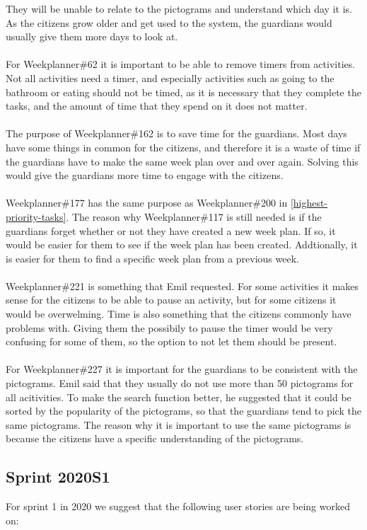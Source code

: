 They will be unable to relate to the pictograms and understand which day it is.
As the citizens grow older and get used to the system, the guardians would usually give them more days to look at.
\\\\
For Weekplanner\#62 it is important to be able to remove timers from activities. 
Not all activities need a timer, and especially activities such as going to the bathroom or eating should not be timed, as it is necessary that they complete the tasks, and the amount of time that they spend on it does not matter.
\\\\
The purpose of Weekplanner\#162 is to save time for the guardians. 
Most days have some things in common for the citizens, and therefore it is a waste of time if the guardians have to make the same week plan over and over again.
Solving this would give the guardians more time to engage with the citizens.
\\\\
Weekplanner\#177 has the same purpose as Weekplanner\#200 in \autoref{highest-priority-tasks}. 
The reason why Weekplanner\#117 is still needed is if the guardians forget whether or not they have created a new week plan.
If so, it would be easier for them to see if the week plan has been created.
Addtionally, it is easier for them to find a specific week plan from a previous week.
\\\\
Weekplanner\#221 is something that Emil requested. 
For some activities it makes sense for the citizens to be able to pause an activity, but for some citizens it would be overwelming.
Time is also something that the citizens commonly have problems with. 
Giving them the possibily to pause the timer would be very confusing for some of them, so the option to not let them should be present.
\\\\
For Weekplanner\#227 it is important for the guardians to be consistent with the pictograms.
Emil said that they usually do not use more than 50 pictograms for all acitivities. 
To make the search function better, he suggested that it could be sorted by the popularity of the pictograms, so that the guardians tend to pick the same pictograms.
The reason why it is important to use the same pictograms is because the citizens have a specific understanding of the pictograms.

\subsection{Sprint 2020S1}
For sprint 1 in 2020 we suggest that the following user stories are being worked on:


